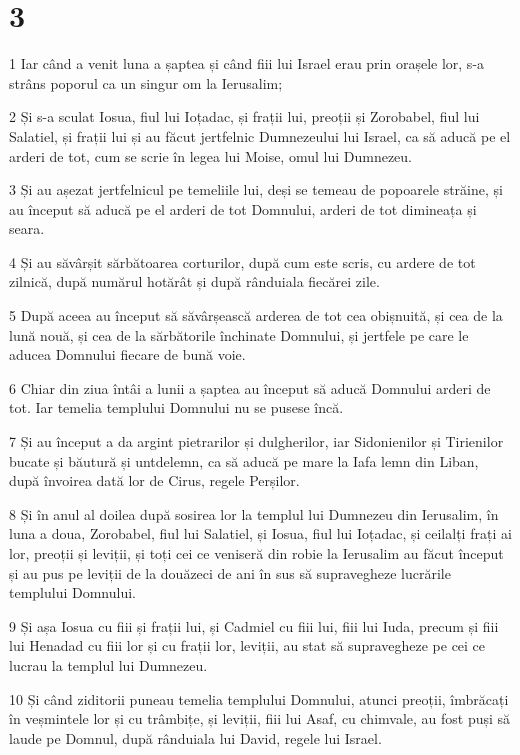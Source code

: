 \chapter{3}

\par 1 Iar când a venit luna a șaptea și când fiii lui Israel erau prin orașele lor, s-a strâns poporul ca un singur om la Ierusalim;
\par 2 Și s-a sculat Iosua, fiul lui Ioțadac, și frații lui, preoții și Zorobabel, fiul lui Salatiel, și frații lui și au făcut jertfelnic Dumnezeului lui Israel, ca să aducă pe el arderi de tot, cum se scrie în legea lui Moise, omul lui Dumnezeu.
\par 3 Și au așezat jertfelnicul pe temeliile lui, deși se temeau de popoarele străine, și au început să aducă pe el arderi de tot Domnului, arderi de tot dimineața și seara.
\par 4 Și au săvârșit sărbătoarea corturilor, după cum este scris, cu ardere de tot zilnică, după numărul hotărât și după rânduiala fiecărei zile.
\par 5 După aceea au început să săvârșească arderea de tot cea obișnuită, și cea de la lună nouă, și cea de la sărbătorile închinate Domnului, și jertfele pe care le aducea Domnului fiecare de bună voie.
\par 6 Chiar din ziua întâi a lunii a șaptea au început să aducă Domnului arderi de tot. Iar temelia templului Domnului nu se pusese încă.
\par 7 Și au început a da argint pietrarilor și dulgherilor, iar Sidonienilor și Tirienilor bucate și băutură și untdelemn, ca să aducă pe mare la Iafa lemn din Liban, după învoirea dată lor de Cirus, regele Perșilor.
\par 8 Și în anul al doilea după sosirea lor la templul lui Dumnezeu din Ierusalim, în luna a doua, Zorobabel, fiul lui Salatiel, și Iosua, fiul lui Ioțadac, și ceilalți frați ai lor, preoții și leviții, și toți cei ce veniseră din robie la Ierusalim au făcut început și au pus pe leviții de la douăzeci de ani în sus să supravegheze lucrările templului Domnului.
\par 9 Și așa Iosua cu fiii și frații lui, și Cadmiel cu fiii lui, fiii lui Iuda, precum și fiii lui Henadad cu fiii lor și cu frații lor, leviții, au stat să supravegheze pe cei ce lucrau la templul lui Dumnezeu.
\par 10 Și când ziditorii puneau temelia templului Domnului, atunci preoții, îmbrăcați în veșmintele lor și cu trâmbițe, și leviții, fiii lui Asaf, cu chimvale, au fost puși să laude pe Domnul, după rânduiala lui David, regele lui Israel.
